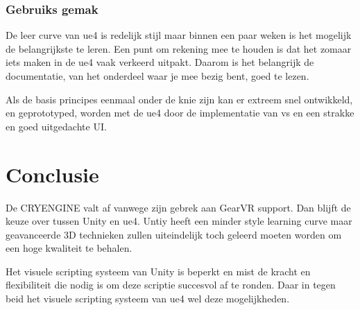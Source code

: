 \subsubsection{Gebruiks gemak}
De leer curve van \gls{ue4} is redelijk stijl maar binnen een paar weken is het mogelijk de belangrijkste te leren. Een punt om rekening mee te houden is dat het zomaar iets maken in de \gls{ue4} vaak verkeerd uitpakt. Daarom is het belangrijk de documentatie, van het onderdeel waar je mee bezig bent, goed te lezen.

Als de basis principes eenmaal onder de knie zijn kan er extreem snel ontwikkeld, en geprototyped, worden met de \gls{ue4} door de implementatie van \gls{vs} en een strakke en goed uitgedachte UI.

\section{Conclusie}
De CRYENGINE valt af vanwege zijn gebrek aan GearVR support. Dan blijft de keuze over tussen Unity en \gls{ue4}. Untiy heeft een minder style learning curve maar geavanceerde 3D technieken zullen uiteindelijk toch geleerd moeten worden om een hoge kwaliteit te behalen. 

Het visuele scripting systeem van Unity is beperkt en mist de kracht en flexibiliteit die nodig is om deze scriptie succesvol af te ronden. Daar in tegen beid het visuele scripting systeem van \gls{ue4} wel deze mogelijkheden.